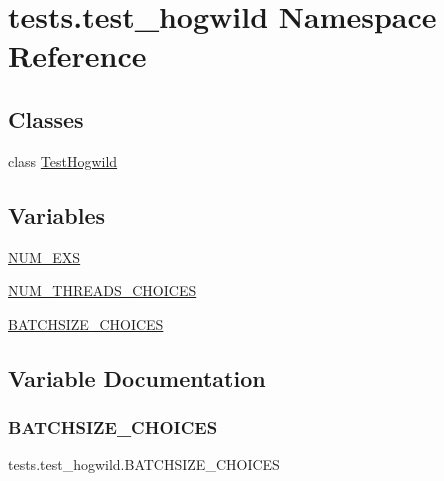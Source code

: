 \hypertarget{namespacetests_1_1test__hogwild}{}\section{tests.\+test\+\_\+hogwild Namespace Reference}
\label{namespacetests_1_1test__hogwild}
\subsection*{Classes}
\begin{DoxyCompactItemize}
\item 
class \hyperlink{classtests_1_1test__hogwild_1_1TestHogwild}{Test\+Hogwild}
\end{DoxyCompactItemize}
\subsection*{Variables}
\begin{DoxyCompactItemize}
\item 
\hyperlink{namespacetests_1_1test__hogwild_af5f3468ddbdd302085c18cf0808fafdb}{N\+U\+M\+\_\+\+E\+XS}
\item 
\hyperlink{namespacetests_1_1test__hogwild_a7fa170a2cea05b9b97d289b76c6859ee}{N\+U\+M\+\_\+\+T\+H\+R\+E\+A\+D\+S\+\_\+\+C\+H\+O\+I\+C\+ES}
\item 
\hyperlink{namespacetests_1_1test__hogwild_afb9d66ee06b7e6e200b1110f64536670}{B\+A\+T\+C\+H\+S\+I\+Z\+E\+\_\+\+C\+H\+O\+I\+C\+ES}
\end{DoxyCompactItemize}


\subsection{Variable Documentation}
\mbox{\label{namespacetests_1_1test__hogwild_afb9d66ee06b7e6e200b1110f64536670}} 
\subsubsection{\texorpdfstring{B\+A\+T\+C\+H\+S\+I\+Z\+E\+\_\+\+C\+H\+O\+I\+C\+ES}{BATCHSIZE\_CHOICES}}
{\footnotesize\ttfamily tests.\+test\+\_\+hogwild.\+B\+A\+T\+C\+H\+S\+I\+Z\+E\+\_\+\+C\+H\+O\+I\+C\+ES}



